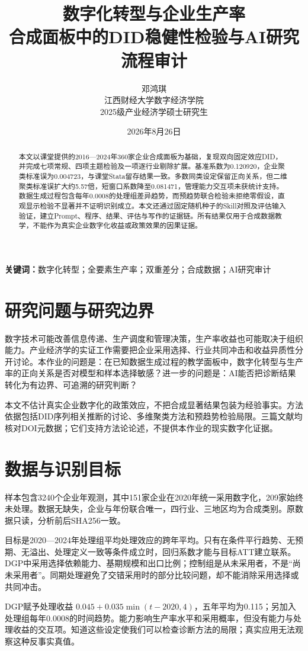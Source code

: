 \documentclass[UTF8,11pt,fontset=none]{ctexart}
\title{数字化转型与企业生产率\\合成面板中的DID稳健性检验与AI研究流程审计}
\author{邓鸿琪\quad 825200520\\江西财经大学数字经济学院\\2025级产业经济学硕士研究生}
\date{2026年8月26日}
\begin{document}
\maketitle
\begin{abstract}
本文以课堂提供的2016—2024年360家企业合成面板为基础，复现双向固定效应DID，并完成七项常规、四项主题检验及一项逐行业剔除扩展。基准系数为0.120920，企业聚类标准误为0.004723，与课堂Stata留存结果一致。多数同类设定保留正向关系，但二维聚类标准误扩大约5.57倍，短窗口系数降至0.081471，管理能力交互项未获统计支持。数据生成过程包含每年0.0008的处理组差异趋势，而预趋势联合检验未拒绝零假设，直观显示检验不显著并不证明识别成立。本文还通过固定随机种子的Skill对照及评估输入验证，建立Prompt、程序、结果、评估与写作的证据链。所有结果仅用于合成数据教学，不能作为真实企业数字化收益或政策效果的因果证据。
\end{abstract}
\noindent\textbf{关键词：}数字化转型；全要素生产率；双重差分；合成数据；AI研究审计

\section{研究问题与研究边界}
数字技术可能改善信息传递、生产调度和管理决策，生产率收益也可能取决于组织能力。产业经济学的实证工作需要把企业采用选择、行业共同冲击和收益异质性分开讨论。本作业的问题是：在已知数据生成过程的教学面板中，数字化转型与生产率的正向关系是否对模型和样本选择敏感？进一步的问题是：AI能否把诊断结果转化为有边界、可追溯的研究判断？

本文不估计真实企业数字化的政策效应，不把合成显著结果包装为经验事实。方法依据包括DID序列相关推断的讨论\cite{bdm}、多维聚类方法\cite{cgm}和预趋势检验局限\cite{roth}。三篇文献均核对DOI元数据；它们支持方法论论述，不提供本作业的现实数字化证据。

\section{数据与识别目标}
样本包含3240个企业年观测，其中151家企业在2020年统一采用数字化，209家始终未处理。数据无缺失，企业与年份联合唯一，四行业、三地区均为合成类别。原数据只读，分析前后SHA256一致。

目标是2020—2024年处理组平均处理效应的跨年平均。只有在条件平行趋势、无预期、无溢出、处理定义一致等条件成立时，回归系数才能与目标ATT建立联系。DGP中采用选择依赖能力、基期规模和出口比例；控制组是从未采用者，不是“尚未采用者”。同期处理避免了交错采用时的部分比较问题，却不能消除采用选择或共同冲击。

DGP赋予处理收益 $0.045+0.035\min(t-2020,4)$，五年平均为0.115；另加入处理组每年0.0008的时间趋势。能力影响生产率水平和采用概率，但没有能力与处理收益的交互项。知道这些设定使我们可以检查诊断方法的局限；真实应用无法观察这种反事实真值。
\end{document}
